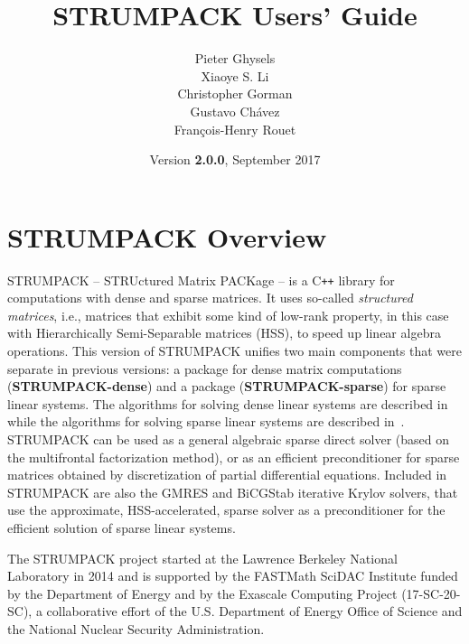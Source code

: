 \documentclass{article}
\title{\textbf{STRUMPACK Users' Guide}}
\author{Pieter Ghysels\footnotemark[1] \\
  Xiaoye S. Li\footnotemark[1] \\
  Christopher Gorman\footnotemark[2] \\
  Gustavo Ch\'{a}vez\footnotemark[1] \\
  Fran\c{c}ois-Henry Rouet\footnotemark[3]}
\date{Version \textbf{2.0.0}, September 2017}
\begin{document}
\maketitle

\vfill


\pagebreak

\tableofcontents

\pagebreak
\section{STRUMPACK Overview}
STRUMPACK -- STRUctured Matrix PACKage -- is a C\texttt{++} library
for computations with dense and sparse matrices. It uses so-called
\emph{structured matrices}, i.e., matrices that exhibit some kind of
low-rank property, in this case with Hierarchically Semi-Separable
matrices (HSS), to speed up linear algebra operations.  This version
of STRUMPACK unifies two main components that were separate in
previous versions: a package for dense matrix computations
(\textbf{STRUMPACK-dense}) and a package (\textbf{STRUMPACK-sparse})
for sparse linear systems. The algorithms for solving dense linear
systems are described in~\cite{rouet2014distributed} while the
algorithms for solving sparse linear systems are described
in~\cite{ghysels2015sparse,ghysels2017sparse}. STRUMPACK can be used
as a general algebraic sparse direct solver (based on the multifrontal
factorization method), or as an efficient preconditioner for sparse
matrices obtained by discretization of partial differential
equations. Included in STRUMPACK are also the GMRES and BiCGStab
iterative Krylov solvers, that use the approximate, HSS-accelerated,
sparse solver as a preconditioner for the efficient solution of sparse
linear systems.

The STRUMPACK project started at the Lawrence Berkeley National
Laboratory in 2014 and is supported by the FASTMath SciDAC Institute
funded by the Department of Energy and by the Exascale Computing
Project (17-SC-20-SC), a collaborative effort of the U.S. Department
of Energy Office of Science and the National Nuclear Security
Administration.
\end{document}
